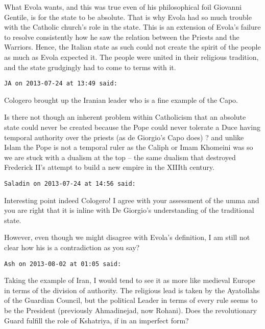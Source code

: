 \begin{footnotesize}
\begin{sffamily}
What Evola wants, and this was true even of his philosophical foil Giovanni Gentile, is for the state to be absolute. That is why Evola had so much trouble with the Catholic church's role in the state. This is an extension of Evola's failure to resolve consistently how he saw the relation between the Priests and the Warriors. Hence, the Italian state as such could not create the spirit of the people as much as Evola expected it. The people were united in their religious tradition, and the state grudgingly had to come to terms with it.


\hfill

\texttt{JA on 2013-07-24 at 13:49 said: }

Cologero brought up the Iranian leader who is a fine example of the Capo.

Is there not though an inherent problem within Catholicism that an absolute state could never be created because the Pope could never tolerate a Duce having temporal authority over the priests (as de Giorgio's Capo does) ? and unlike Islam the Pope is not a temporal ruler as the Caliph or Imam Khomeini was so we are stuck with a dualism at the top – the same dualism that destroyed Frederick II's attempt to build a new empire in the XIIIth century.


\hfill

\texttt{Saladin on 2013-07-24 at 14:56 said: }

Interesting point indeed Cologero! I agree with your assessment of the umma and you are right that it is inline with De Giorgio's understanding of the traditional state.

However, even though we might disagree with Evola's definition, I am still not clear how his is a contradiction as you say?


\hfill

\texttt{Ash on 2013-08-02 at 01:05 said: }

Taking the example of Iran, I would tend to see it as more like medieval Europe in terms of the division of authority. The religious lead is taken by the Ayatollahs of the Guardian Council, but the political Leader in terms of every rule seems to be the President (previously Ahmadinejad, now Rohani). Does the revolutionary Guard fulfill the role of Kshatriya, if in an imperfect form? 


\end{sffamily}
\end{footnotesize}
